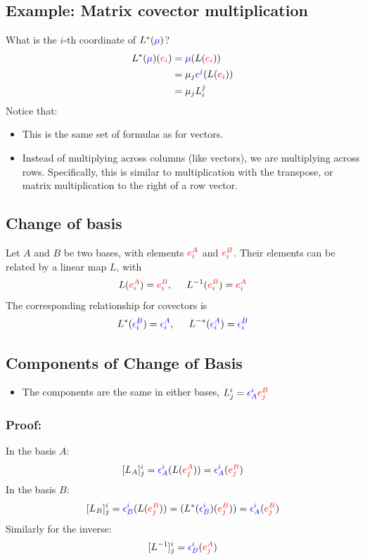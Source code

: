 \documentclass[10pt]{article}
\begin{document}
\subsection*{Example: Matrix covector multiplication}
What is the $i$-th coordinate of $L^*(\textcolor{blue}{\mu})$?
\begin{align*}
    L^*(\textcolor{blue}{\mu})(\textcolor{red}{e_i}) &= \textcolor{blue}{\mu}(L(\textcolor{red}{e_i}))\\
    &= \mu_j \textcolor{blue}{\epsilon^j}(L(\textcolor{red}{e_i}))\\
    &= \mu_j L_i^j
\end{align*}
Notice that:
\begin{itemize}
    \item This is the same set of formulas as for vectors.
    \item Instead of multiplying across columns (like vectors), we are multiplying across rows.  Specifically, this is similar to multiplication with the transpose, or matrix multiplication to the right of a row vector.
\end{itemize}

\subsection*{Change of basis}
Let $A$ and $B$ be two bases, with elements $\textcolor{red}{e_i^A}$ and $\textcolor{red}{e_i^B}$.  Their elements can be related by a linear map $L$, with
\[L(\textcolor{red}{e_i^A}) = \textcolor{red}{e_i^B}, \hspace{0.5cm}L^{-1}(\textcolor{red}{e_i^B}) = \textcolor{red}{e_i^A}\]
The corresponding relationship for covectors is
\[L^*(\textcolor{blue}{\epsilon_i^B}) = \textcolor{blue}{\epsilon_i^A}, \hspace{0.5cm}L^{-*}(\textcolor{blue}{\epsilon_i^A}) = \textcolor{blue}{\epsilon_i^B}\]

\subsection*{Components of Change of Basis}
\begin{itemize}
    \item The components are the same in either bases, $L_j^i = \textcolor{blue}{\epsilon_A^i} \textcolor{red}{e_j^B}$
\end{itemize}
\subsubsection*{Proof:}
In the basis $A$:
\[[L_A]_j^i = \textcolor{blue}{\epsilon_A^i}(L(\textcolor{red}{e_j^A})) = \textcolor{blue}{\epsilon_A^i}(\textcolor{red}{e_j^B})\]
In the basis $B$:
\[[L_B]_j^i = \textcolor{blue}{\epsilon_B^i}(L(\textcolor{red}{e_j^B})) = (L^*(\textcolor{blue}{\epsilon_B^i})(\textcolor{red}{e_j^B})) = \textcolor{blue}{\epsilon_A^i}(\textcolor{red}{e_j^B})\]
Similarly for the inverse:
\[[L^{-1}]_j^i = \textcolor{blue}{\epsilon_B^i}(\textcolor{red}{e_j^A})\]
\end{document}
